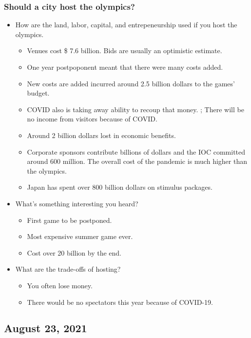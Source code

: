 \documentclass{scrreprt} %
\begin{document}
\subsubsection{Should a city host the olympics?}

\begin{itemize}
	\item How are the land, labor, capital, and entrepeneurship used if
	you host the olympics.
	\begin{itemize}
		\item Venues cost \$ 7.6 billion. Bids are usually an optimistic estimate.
		\item One year postpoponent meant that there were many costs added.
		\item New costs are added incurred around 2.5 billion dollars to the games' budget.
		\item COVID also is taking away ability to recoup that money.
		; There will be no income from visitors because of COVID.
		\item Around 2 billion dollars lost in economic benefits.
		\item Corporate sponsors contribute billions of dollars and the IOC
		committed around 600 million. The overall cost of the pandemic is much
		higher than the olympics.
		\item Japan has spent over 800 billion dollars on stimulus packages.
	\end{itemize}
	\item What's something interesting you heard?
	\begin{itemize}
		\item First game to be postponed.
		\item Most expensive summer game ever.
		\item Cost over 20 billion by the end.
	\end{itemize}
	\item What are the trade-offs of hosting?
	\begin{itemize}
		\item You often lose money.
		\item There would be no spectators this year because of COVID-19.
	\end{itemize}
\end{itemize}

\subsection{August 23, 2021}
\end{document}
